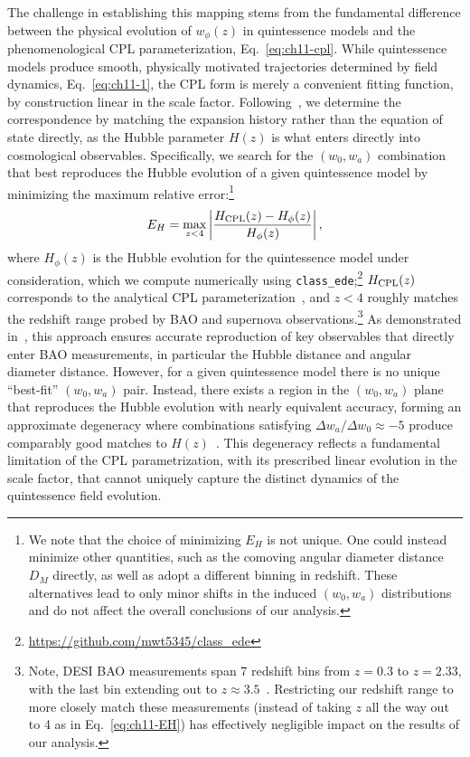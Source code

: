 The challenge in establishing this mapping stems from the fundamental difference between the physical evolution of $w_\phi(z)$ in quintessence models and the phenomenological CPL parameterization, Eq.~\eqref{eq:ch11-cpl}. While quintessence models produce smooth, physically motivated trajectories determined by field dynamics, Eq.~\eqref{eq:ch11-1}, the CPL form is merely a convenient fitting function, by construction linear in the scale factor. Following~\cite{Shlivko:2024llw,Shlivko:2025fgv}, we determine the correspondence by matching the expansion history rather than the equation of state directly, as the Hubble parameter $H(z)$ is what enters directly into cosmological observables.
Specifically, we search for the $(w_0,w_a)$ combination that best reproduces the Hubble evolution of a given quintessence model by minimizing the maximum relative error:\footnote{We note that the choice of minimizing $E_H$ is not unique. One could instead minimize other quantities, such as the comoving angular diameter distance
$D_M$ directly, as well as adopt a different binning in redshift. These alternatives lead to only minor shifts in the induced $(w_0,w_a)$ distributions and do not affect the overall conclusions of our analysis.}
\begin{equation}
    E_H=\underset{z<4}{\rm max}\left|\frac{H_{\rm CPL}(z) - H_\phi(z)}{H_\phi(z)}\right|,\label{eq:ch11-EH}
\end{equation}
where $H_\phi(z)$ is the Hubble evolution for the quintessence model under consideration, which we compute numerically using \texttt{class\_ede};\footnote{\url{https://github.com/mwt5345/class_ede}} $H_{\rm CPL}(z)$ corresponds to the analytical CPL parameterization~\cite{Chevallier:2000qy,Linder:2002et},
and $z<4$ roughly matches the redshift range probed by BAO and supernova observations.\footnote{Note, DESI BAO measurements span 7 redshift bins from $z=0.3$ to $z=2.33$, with the last bin extending out to $z\approx 3.5$~\cite{DESI:2024uvr,DESI:2024aqx}. Restricting our redshift range to more closely match these measurements (instead of taking $z$ all the way out to 4 as in Eq.~\eqref{eq:ch11-EH}) has effectively negligible impact on the results of our analysis.} As demonstrated in~\cite{Shlivko:2024llw}, this approach ensures accurate reproduction of key observables that directly enter BAO measurements, in particular the Hubble distance and angular diameter distance. However, for a given quintessence model there is no unique ``best-fit'' $(w_0,w_a)$ pair. Instead, there exists a region in the $(w_0,w_a)$ plane that reproduces the Hubble evolution with nearly equivalent accuracy, forming an approximate degeneracy where combinations satisfying $\Delta w_a/\Delta w_0 \approx -5$ produce comparably good matches to $H(z)$~\cite{Shlivko:2024llw}. This degeneracy reflects a fundamental limitation of the CPL parametrization, with its prescribed linear evolution in the scale factor, that cannot uniquely capture the distinct dynamics of the quintessence field evolution.

